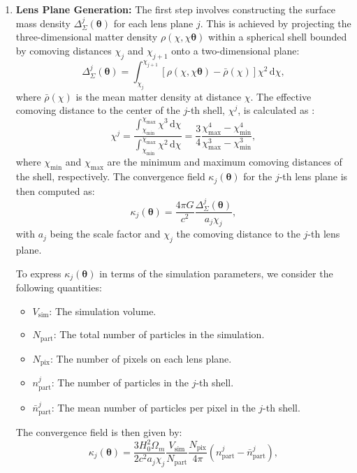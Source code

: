 \begin{enumerate}
    \item \textbf{Lens Plane Generation:} 
    The first step involves constructing the surface mass density $\Delta_\Sigma^j(\boldsymbol{\theta})$ for each lens plane $j$. This is achieved by projecting the three-dimensional matter density $\rho(\chi, \chi\boldsymbol{\theta})$ within a spherical shell bounded by comoving distances $\chi_j$ and $\chi_{j+1}$ onto a two-dimensional plane:
    \begin{equation}
        \Delta_\Sigma^j(\boldsymbol{\theta}) = \int_{\chi_j}^{\chi_{j+1}} \left[ \rho(\chi, \chi\boldsymbol{\theta}) - \bar{\rho}(\chi) \right] \chi^2 \, \mathrm{d}\chi,
    \end{equation}
    where $\bar{\rho}(\chi)$ is the mean matter density at distance $\chi$. 
    The effective comoving distance to the center of the $j$-th shell, $\chi^j$, is calculated as \citep{2015MNRAS.453.3043S}:
    \begin{equation}
        \chi^j = \frac{\int_{\chi_{\min}}^{\chi_{\max}} \chi^3 \, \mathrm{d}\chi}{\int_{\chi_{\min}}^{\chi_{\max}} \chi^2 \, \mathrm{d}\chi} = \frac{3}{4} \frac{\chi_{\max}^4 - \chi_{\min}^4}{\chi_{\max}^3 - \chi_{\min}^3},
    \end{equation}
    where $\chi_{\min}$ and $\chi_{\max}$ are the minimum and maximum comoving distances of the shell, respectively.
    The convergence field $\kappa_j(\boldsymbol{\theta})$ for the $j$-th lens plane is then computed as:
    \begin{equation}
        \kappa_j(\boldsymbol{\theta}) = \frac{4\pi G}{c^2} \frac{\Delta_\Sigma^j(\boldsymbol{\theta})}{a_j \chi_j},
    \end{equation}
    with $a_j$ being the scale factor and $\chi_j$ the comoving distance to the $j$-th lens plane.

    To express $\kappa_j(\boldsymbol{\theta})$ in terms of the simulation parameters, we consider the following quantities:
    \begin{itemize}
        \item $V_{\mathrm{sim}}$: The simulation volume.
        \item $N_{\mathrm{part}}$: The total number of particles in the simulation.
        \item $N_{\mathrm{pix}}$: The number of pixels on each lens plane.
        \item $n_{\mathrm{part}}^j$: The number of particles in the $j$-th shell.
        \item $\bar{n}_{\mathrm{part}}^j$: The mean number of particles per pixel in the $j$-th shell.
    \end{itemize}
    The convergence field is then given by:
    \begin{equation}
        \kappa_j(\boldsymbol{\theta}) = \frac{3H_0^2\Omega_m}{2c^2 a_j \chi_j} \frac{V_{\mathrm{sim}}}{N_{\mathrm{part}}} \frac{N_{\mathrm{pix}}}{4\pi} \left( n_{\mathrm{part}}^j - \bar{n}_{\mathrm{part}}^j \right),
    \end{equation}


\end{enumerate}
